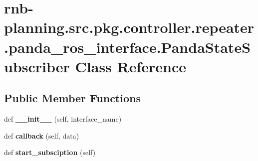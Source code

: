 \hypertarget{classrnb-planning_1_1src_1_1pkg_1_1controller_1_1repeater_1_1panda__ros__interface_1_1_panda_state_subscriber}{}\section{rnb-\/planning.src.\+pkg.\+controller.\+repeater.\+panda\+\_\+ros\+\_\+interface.\+Panda\+State\+Subscriber Class Reference}
\label{classrnb-planning_1_1src_1_1pkg_1_1controller_1_1repeater_1_1panda__ros__interface_1_1_panda_state_subscriber}
\subsection*{Public Member Functions}
\begin{DoxyCompactItemize}
\item 
\mbox{\label{classrnb-planning_1_1src_1_1pkg_1_1controller_1_1repeater_1_1panda__ros__interface_1_1_panda_state_subscriber_a02123dedef217799f053a7e40daaae45}} 
def {\bfseries \+\_\+\+\_\+init\+\_\+\+\_\+} (self, interface\+\_\+name)
\item 
\mbox{\label{classrnb-planning_1_1src_1_1pkg_1_1controller_1_1repeater_1_1panda__ros__interface_1_1_panda_state_subscriber_a4da5154926a19d01ee7d929d731e9217}} 
def {\bfseries callback} (self, data)
\item 
\mbox{\label{classrnb-planning_1_1src_1_1pkg_1_1controller_1_1repeater_1_1panda__ros__interface_1_1_panda_state_subscriber_a765665404ef1cb6a7429a8d68ddcf57f}} 
def {\bfseries start\+\_\+subsciption} (self)
\end{DoxyCompactItemize}
